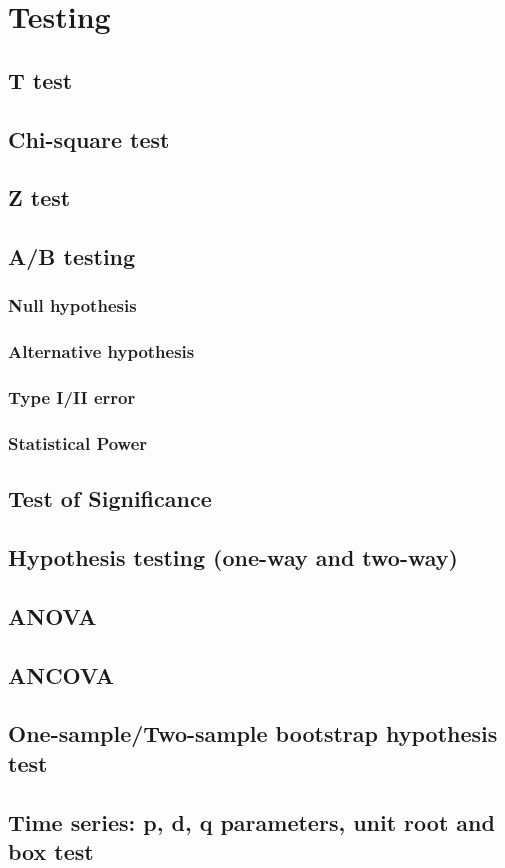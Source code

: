 \graphicspath{%
{chapter3graph/}%
{chapter3graph/bg/}}

\chapter{Testing}

\section{T test}

\section{Chi-square test}

\section{Z test}

\section{A/B testing}

\subsection{Null hypothesis}

\subsection{Alternative hypothesis}

\subsection{Type I/II error}

\subsection{Statistical Power}

\section{Test of Significance}

\section{Hypothesis testing (one-way and two-way)}

\section{ANOVA}

\section{ANCOVA}

\section{One-sample/Two-sample bootstrap hypothesis test}

\section{Time series: p, d, q parameters, unit root and box test}



